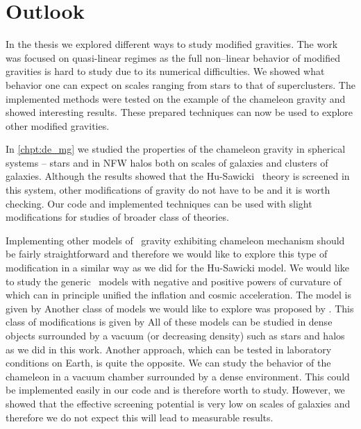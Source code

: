 \chapter{Outlook}
\label{chpt:outlook}
In the thesis we explored different ways to study modified gravities. The work was focused on quasi-linear regimes as the full non--linear behavior of modified gravities is hard to study due to its numerical difficulties. We showed what behavior one can expect on scales ranging from stars to that of superclusters. The implemented methods were tested on the example of the chameleon gravity and showed interesting results. These prepared techniques can now be used to explore other modified gravities.

In \autoref{chpt:de_mg} we studied the properties of the chameleon gravity in spherical systems -- stars and in NFW halos both on scales of galaxies and clusters of galaxies. Although the results showed that the Hu-Sawicki \fR\ theory is screened in this system, other modifications of gravity do not have to be and it is worth checking. Our code and implemented techniques can be used with slight modifications for studies of broader class of theories.

Implementing other models of \fR\ gravity exhibiting chameleon mechanism should be fairly straightforward and therefore we would like to explore this type of modification in a similar way as we did for the Hu-Sawicki model. We would like to study the generic \fR\ models with negative and positive powers of curvature of \textcite{2003PhRvD..68l3512N} which can in principle unified the inflation and cosmic acceleration. The model is given by
Another class of models we would like to explore was proposed by \textcite{2007JETPL..86..157S}. This class of modifications is given by
All of these models can be studied in dense objects surrounded by a vacuum (or decreasing density) such as stars and halos as we did in this work. Another approach, which can be tested in laboratory conditions on Earth, is quite the opposite. We can study the behavior of the chameleon in a vacuum chamber surrounded by a dense environment. This could be implemented easily in our code and is therefore worth to study. However, we showed that the effective screening potential is very low on scales of galaxies and therefore we do not expect this will lead to measurable results.

